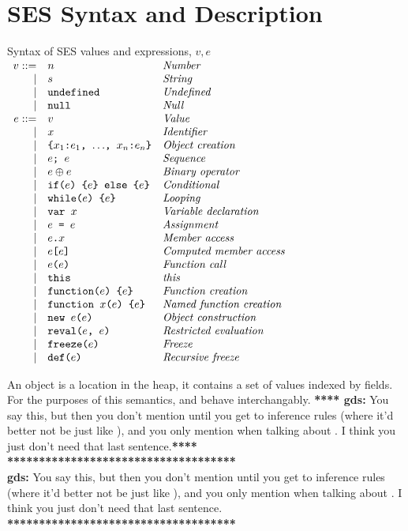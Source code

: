 \documentclass[a4paper]{article}
\begin{document}
\section{SES Syntax and Description}

\newcommand{\gds}[1]{\ifmmode \textbf{**** gds: }\textrm{#1}\textbf{****}\else
  \\\textbf{************************************}\\
  \textbf{gds: }#1\\\textbf{************************************}\\
  \fi}
\newcommand{\FIXME}[1]{~\vg\colorbox{red}{\textbf{FIXME:}}\textrm{ #1}\vg}
\newcommand{\TODO}[1]{~\vg\colorbox{yellow}{\textbf{TODO:}}\textrm{ #1}\vg}

\newcommand{\syntaxline}[3][\pipe]{#1 & \js{#2} & \textit{#3}\\}
\begin{display}{Syntax of SES values and expressions, $v, e$}
  $\begin{array}{rll}
    \syntaxline[v ::=]{$n$}{Number}
    \syntaxline{$s$}{String}
    \syntaxline{undefined}{Undefined}
    \syntaxline{null}{Null}
    \syntaxline[e ::=]{$v$}{Value}
    \syntaxline{$x$}{Identifier}
    \syntaxline{\{$x_1$:$e_1$, $\ldots$, $x_n$:$e_n$\}}{Object creation}
    \syntaxline{$e$; $e$}{Sequence}
    \syntaxline{$e \oplus e$}{Binary operator}
    \syntaxline{if($e$) \{$e$\} else \{$e$\}}{Conditional}
    \syntaxline{while($e$) \{$e$\}}{Looping}
    \syntaxline{var $x$}{Variable declaration}
    \syntaxline{$e$ = $e$}{Assignment}
    \syntaxline{$e$.$x$}{Member access}
    \syntaxline{$e$[$e$]}{Computed member access}
    \syntaxline{$e$($e$)}{Function call}
    \syntaxline{this}{this}
    \syntaxline{function($e$) \{$e$\}}{Function creation}
    \syntaxline{function $x$($e$) \{$e$\}}{Named function creation}
    \syntaxline{new $e$($e$)}{Object construction}
    \syntaxline{reval($e$, $e$)}{Restricted evaluation}
    \syntaxline{freeze($e$)}{Freeze}
    \syntaxline{def($e$)}{Recursive freeze}
  \end{array}$
\end{display}

An object is a location in the heap, it contains a set of
values indexed by fields.
For the purposes of this semantics,  and  behave
interchangably.
\gds{You say this, but then you don't mention \js{null} until you get to
  inference rules (where it'd better not be just like \js{undefined}), and you
  only mention \js{undefined} when talking about \js{this}. I think you just
  don't need that last sentence.}
\end{document}
